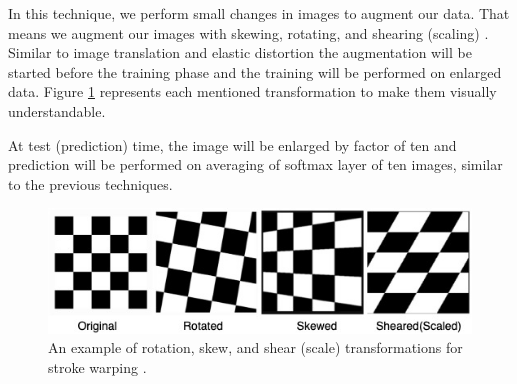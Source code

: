 In this technique, we perform small changes in images to augment our data.  That means we augment our
images with skewing, rotating, and shearing (scaling) \cite{storke_warping_1997_source}. Similar to
image translation and elastic distortion the augmentation will be started before the
training phase and the training will be performed on enlarged data. Figure
\ref{fig:stroke_warping_transforamtions} represents each mentioned transformation to make them visually
understandable.

At test (prediction) time, the image will be enlarged by factor of ten and prediction will be performed on
averaging of softmax layer of ten  images, similar to the previous techniques.

\begin{figure}
  \centering
  \label{fig:stroke_warping_transforamtions}
  \includegraphics[width=1\textwidth]{fig/stroke_warping_transforamtions}
  \caption{An example of rotation, skew, and shear (scale) transformations for stroke warping \cite{stroke_warping_github_picture}.}
\end{figure}


